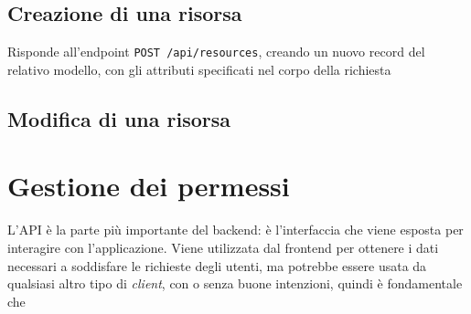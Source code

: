 \subsection{Creazione di una risorsa}
Risponde all'endpoint \verb|POST /api/resources|, creando un nuovo record del relativo modello, con gli attributi specificati nel corpo della richiesta

\subsection{Modifica di una risorsa}



\section{Gestione dei permessi}

L'API è la parte più importante del backend: è l'interfaccia che viene esposta per interagire con l'applicazione. Viene utilizzata dal frontend per ottenere i dati necessari a soddisfare le richieste degli utenti, ma potrebbe essere usata da qualsiasi altro tipo di \emph{client}, con o senza buone intenzioni, quindi è fondamentale che 

